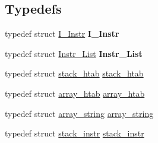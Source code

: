 \subsection*{Typedefs}
\begin{DoxyCompactItemize}
\item 
typedef struct \hyperlink{structI__Instr}{I\+\_\+\+Instr} {\bfseries I\+\_\+\+Instr}\hypertarget{group__structures_gadfc08cf22bec87cfe209d4921155d12d}{}\label{group__structures_gadfc08cf22bec87cfe209d4921155d12d}

\item 
typedef struct \hyperlink{structInstr__List}{Instr\+\_\+\+List} {\bfseries Instr\+\_\+\+List}\hypertarget{group__structures_ga5045b797aa91051c0510688714632408}{}\label{group__structures_ga5045b797aa91051c0510688714632408}

\item 
typedef struct \hyperlink{structstack__htab}{stack\+\_\+htab} \hyperlink{group__structures_ga2942b6731254b98ce39056197f5d171a}{stack\+\_\+htab}
\item 
typedef struct \hyperlink{structarray__htab}{array\+\_\+htab} \hyperlink{group__structures_gafa5247cb58c9cbc3aacc8616d3bd3406}{array\+\_\+htab}
\item 
typedef struct \hyperlink{structarray__string}{array\+\_\+string} \hyperlink{group__structures_gae454366e089196c48b5339fb91a9c7e4}{array\+\_\+string}
\item 
typedef struct \hyperlink{structstack__instr}{stack\+\_\+instr} \hyperlink{group__structures_ga8644786468172a68ec450346ae4d6522}{stack\+\_\+instr}
\end{DoxyCompactItemize}

